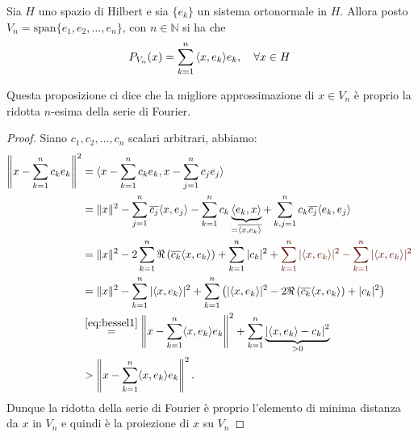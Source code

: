 \begin{proposition}\label{prop:2-45}
    Sia \(H\) uno spazio di Hilbert e sia \(\{e_{k}\} \) un sistema ortonormale
    in \(H\). Allora posto \(V_{n} = \mathrm{span}\{e_{1}, e_{2}, \dots, e_{n}\}\), con
    \(n \in \mathbb{N}\) si ha che 
    \[
      P_{V_{n}} {(x)} = \sum_{k=1}^{n} {\left\langle x, e_{k}\right\rangle} e_{k}, \quad \forall x
      \in H 
    \]
\end{proposition}
\begin{remark}
    Questa proposizione ci dice che la migliore approssimazione di \(x \in
    V_{n}\) è proprio la ridotta \(n\)-esima della serie di Fourier.
\end{remark}
\begin{proof}
    Siano \(c_{1}, c_{2}, \dots, c_{n}\) scalari arbitrari, abbiamo:
    \[
    \begin{aligned}
        \left\| x - \sum_{k=1}^{n} c_{k} e_{k} \right\|^2 
        &= \langle x - \sum_{k=1}^{n} c_{k} e_{k}, x - \sum_{j=1}^{n} c_{j} e_{j} \rangle \\
        &= \|x\|^2 - \sum_{j=1}^{n} \overline{c_{j}} \langle x, e_{j} \rangle 
           - \sum_{k=1}^{n} c_{k} \underbrace{\langle e_{k}, x \rangle}_{= \overline{\langle x, e_{k} \rangle}} 
           + \sum_{k,j=1}^{n} c_{k} \overline{c_{j}} \langle e_{k}, e_{j} \rangle \\
        &= \|x\|^2 - 2 \sum_{k=1}^{n} \Re \left( \overline{c_{k}} \langle x, e_{k} \rangle \right) 
           + \sum_{k=1}^{n} |c_{k}|^2 + \color{Sepia}  \sum_{k=1}^{n} |\langle x, e_{k} \rangle|^2 
           - \sum_{k=1}^{n} |\langle x, e_{k} \rangle|^2 \\
        &= \|x\|^2 - \sum_{k=1}^{n} |\langle x, e_{k} \rangle|^2 
           + \sum_{k=1}^{n} \left( |\langle x, e_k \rangle|^2 
           - 2 \Re \left( \overline{c_{k}} \langle x, e_{k} \rangle \right) + |c_{k}|^2 \right) \\
        &\overset{\eqref{eq:bessel1}}{=} \left\| x - \sum_{k=1}^{n} \langle x, e_{k} \rangle e_{k} \right\|^2 
           + \sum_{k=1}^{n} \underbrace{\left| \langle x, e_{k} \rangle - c_{k} \right|^2}_{> 0} \\
        &> \left\| x - \sum_{k=1}^{n} \langle x, e_{k} \rangle e_{k} \right\|^2.
    \end{aligned}
    \]
    Dunque la ridotta della serie di Fourier è proprio l'elemento di minima
    distanza da \(x\) in \(V_{n}\) e quindi è la proiezione di \(x\) su
    \(V_{n}\)
\end{proof}

